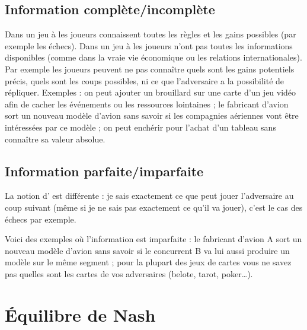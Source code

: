 \documentclass[11pt,class=report,crop=false]{standalone}
\begin{document}
\subsection{Information complète/incomplète}

Dans un jeu à  les joueurs connaissent toutes les règles et les gains possibles (par exemple les échecs).
Dans un jeu à  les joueurs n'ont pas toutes les informations disponibles (comme dans la vraie vie économique ou les relations internationales).
Par exemple les joueurs peuvent ne pas connaître quels sont les gains potentiels précis, quels sont les coups possibles, ni ce que l'adversaire a la possibilité de répliquer.
Exemples : on peut ajouter un brouillard sur une carte d'un jeu vidéo afin de cacher les événements ou les ressources lointaines ; 
le fabricant d'avion sort un nouveau modèle d'avion sans savoir si les compagnies aériennes vont être intéressées par ce modèle ; on peut enchérir pour l'achat d'un tableau sans connaître sa valeur absolue.

\subsection{Information parfaite/imparfaite}

La notion d' est différente : je sais exactement ce que peut jouer l'adversaire au coup suivant (même si je ne sais pas exactement ce qu'il va jouer), c'est le cas des échecs par exemple.

Voici des exemples où l'information est imparfaite :
le fabricant d'avion A sort un nouveau modèle d'avion sans savoir si le concurrent B va lui aussi produire un modèle sur le même segment ;
pour la plupart des jeux de cartes vous ne savez pas quelles sont les cartes de vos adversaires (belote, tarot, poker\ldots).


	
\section{Équilibre de Nash}


\end{document}
